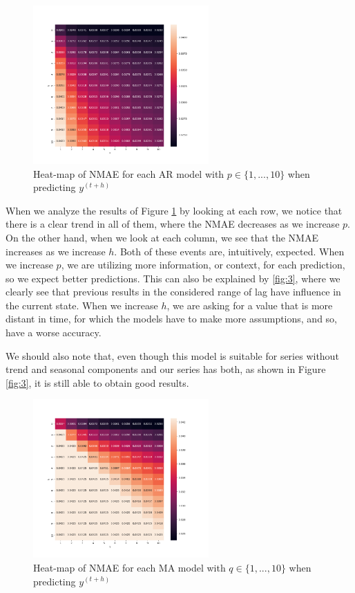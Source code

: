 \documentclass[10pt]{article}
\begin{document}
\begin{figure}[!ht]
    \centering
    \includegraphics[width=0.6\textwidth,height=\textheight,keepaspectratio]{../ar_nmae_heatmap.png}
    \caption{Heat-map of \textsc{NMAE} for each AR model with $p\in\{1,...,10\}$ when predicting $y^{(t+h)}$}
    \label{fig:5}
\end{figure}


When we analyze the results of Figure \ref{fig:5} by looking at each row, we notice that there is a clear trend in all of them, where the \textsc{NMAE} decreases as we increase $p$. On the other hand, when we look at each column, we see that the \textsc{NMAE} increases as we increase $h$. Both of these events are, intuitively, expected. When we increase $p$, we are utilizing more information, or context, for each prediction, so we expect better predictions. This can also be explained by \ref{fig:3}, where we clearly see that previous results in the considered range of lag have influence in the current state. When we increase $h$, we are asking for a value that is more distant in time, for which the models have to make more assumptions, and so, have a worse accuracy.

We should also note that, even though this model is suitable for series without trend and seasonal components and our series has both, as shown in Figure \ref{fig:3}, it is still able to obtain good results.

\begin{figure}[!ht]
    \centering
    \includegraphics[width=0.6\textwidth,height=\textheight,keepaspectratio]{../ma_nmae_heatmap.png}
    \caption{Heat-map of \textsc{NMAE} for each MA model with $q\in\{1,...,10\}$ when predicting $y^{(t+h)}$}
    \label{fig:6}
\end{figure}
\end{document}
